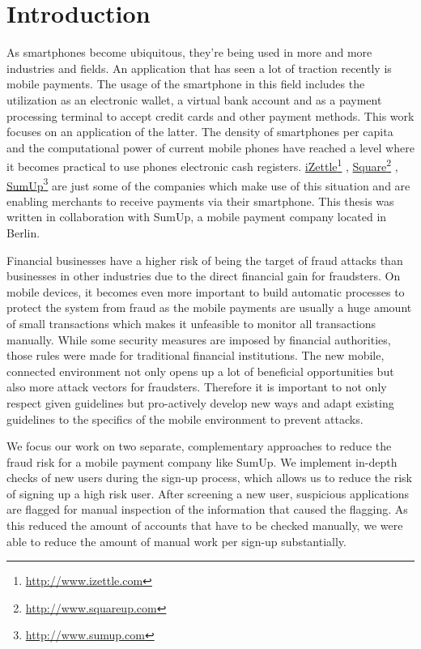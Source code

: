\documentclass[a4paper, oneside]{csthesis}
\newcommand\fnurl[2]{%
  \href{#2}{#1}\footnote{\url{#2}}%
}
\begin{document}
\tableofcontents

\mainmatter %



\chapter{Introduction}

As smartphones become ubiquitous, they're being used in more and more industries and fields. An application that has seen a lot of traction recently is mobile payments. The usage of the smartphone in this field includes the utilization as an electronic wallet, a virtual bank account and as a payment processing terminal to accept credit cards and other payment methods.
This work focuses on an application of the latter.
The density of smartphones per capita and the computational power of current mobile phones have reached a level where it becomes practical to use phones electronic cash registers.
\fnurl{iZettle}{http://www.izettle.com}, \fnurl{Square}{http://www.squareup.com}, \fnurl{SumUp}{http://www.sumup.com} are just some of the companies which make use of this situation and are enabling merchants to receive payments via their smartphone. This thesis was written in collaboration with SumUp, a mobile payment company located in Berlin.


Financial businesses have a higher risk of being the target of fraud attacks than businesses in other industries due to the direct financial gain for fraudsters. On mobile devices, it becomes even more important to build automatic processes to protect the system from fraud as the mobile payments are usually a huge amount of small transactions which makes it unfeasible to monitor all transactions manually. While some security measures are imposed by financial authorities, those rules were made for traditional financial institutions. The new mobile, connected environment not only opens up a lot of beneficial opportunities but also more attack vectors for fraudsters. Therefore it is important to not only respect given guidelines but pro-actively develop new ways and adapt existing guidelines to the specifics of the mobile environment to prevent attacks.

We focus our work on two separate, complementary approaches to reduce the fraud risk for a mobile payment company like SumUp.
We implement in-depth checks of new users during the sign-up process, which allows us to reduce the risk of signing up a high risk user. After screening a new user, suspicious applications are flagged for manual inspection of the information that caused the flagging. As this reduced the amount of accounts that have to be checked manually, we were able to reduce the amount of manual work per sign-up substantially.
\end{document}
